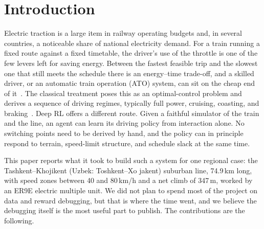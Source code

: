 \documentclass[11pt,a4paper]{article}
\begin{document}
\section{Introduction}
\label{sec:intro}

Electric traction is a large item in railway operating budgets and, in
several countries, a noticeable share of national electricity demand. For
a train running a fixed route against a fixed timetable, the driver's use
of the throttle is one of the few levers left for saving energy. Between
the fastest feasible trip and the slowest one that still meets the
schedule there is an energy--time trade-off, and a skilled driver, or an
automatic train operation (ATO) system, can sit on the cheap end of
it~\cite{scheepmaker2017,howlett1995,yin2017}. The classical treatment
poses this as an optimal-control problem and derives a sequence of
driving regimes, typically full power, cruising, coasting, and
braking~\cite{liu2003,albrecht2016}. Deep RL offers a different route.
Given a faithful simulator of the train and the line, an agent can learn
its driving policy from interaction alone. No switching points need to be
derived by hand, and the policy can in principle respond to terrain,
speed-limit structure, and schedule slack at the same time.

This paper reports what it took to build such a system for one regional
case: the Tashkent--Khojikent (Uzbek: Toshkent--Xo\textquotesingle
jakent) suburban line, 74.9\,km long, with speed zones between 40 and
80\,km/h and a net climb of 347\,m, worked by an ER9E electric multiple
unit. We did not plan to spend most of the project on data and reward
debugging, but that is where the time went, and we believe the debugging
itself is the most useful part to publish. The contributions are the
following.
\end{document}
